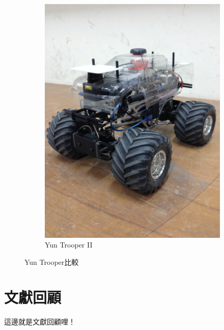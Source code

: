 \begin{figure}[h!]
\begin{subfigure}[b]{0.45\textwidth}
		\includegraphics[width=\textwidth]{figures/YunTrooperII}
		\caption{Yun Trooper II}
		\label{f:YunTrooperII}
	\end{subfigure}
	\caption{Yun Trooper比較}
\end{figure}

\section{文獻回顧}
這邊就是文獻回顧哩！

